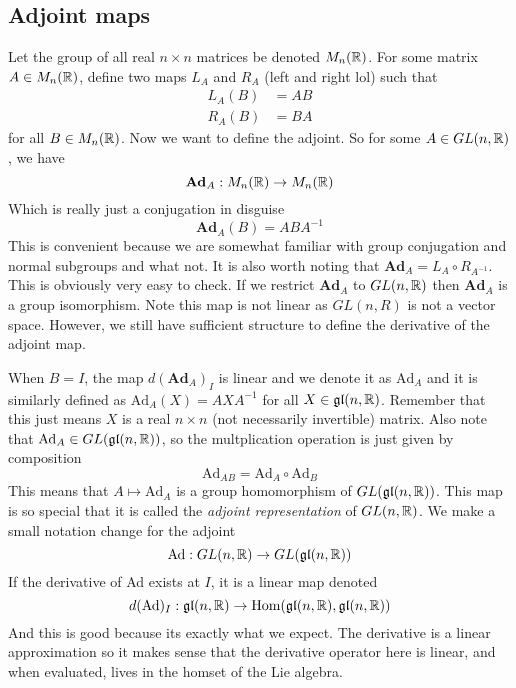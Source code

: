 \subsection{Adjoint maps}
Let the group of all real $n\times n$ matrices be denoted $M_n(\mathbb{R})$. For some matrix
$A\in M_n(\mathbb{R})$, define two maps $L_A$ and $R_A$ (left and right lol) such that
\begin{align*}
    L_A(B) &= AB\\
    R_A(B) &= BA
\end{align*}
for all $B\in M_n(\mathbb{R})$. Now we want to define the adjoint. So for some $A\in GL(n,\mathbb{R})$,
we have
\begin{equation*}
    \textbf{Ad}_A: M_n(\mathbb{R}) \to M_n(\mathbb{R})
\end{equation*}
Which is really just a conjugation in disguise
\begin{equation}
    \textbf{Ad}_A(B) = ABA^{-1}
\end{equation}
This is convenient because we are somewhat familiar with group conjugation and normal
subgroups and what not. It is also worth noting that $\textbf{Ad}_A = L_A
\circ R_{A^{-1}}$. This is obviously very easy to check. If we restrict $\textbf{Ad}_A$
to $GL(n,\mathbb{R})$ then $\textbf{Ad}_A$ is a group isomorphism. Note this map
is not linear as $GL(n,R)$ is not a vector space. However, we still have sufficient
structure to define the derivative of the adjoint map.

When $B=I$, the map $d(\textbf{Ad}_A)_I$ is linear and we denote it as $\text{Ad}_A$
and it is similarly defined as $\text{Ad}_A(X) = AXA^{-1}$ for all $X \in \mathfrak{gl}(n,\mathbb{R})$.
Remember that this just means $X$ is a real $n\times n$ (not necessarily invertible)
matrix. Also note that $\text{Ad}_A \in GL(\mathfrak{gl}(n,\mathbb{R}))$, so the multplication
operation is just given by composition
\begin{equation*}
    \text{Ad}_{AB} = \text{Ad}_A \circ \text{Ad}_B
\end{equation*}
This means that $A \mapsto \text{Ad}_A$ is a group homomorphism of $GL(\mathfrak{gl}(n,\mathbb{R}))$.
This map is so special that it is called the \textit{adjoint representation} of
$GL(n,\mathbb{R})$. We make a small notation change for the adjoint
\begin{equation*}
    \text{Ad}: GL(n,\mathbb{R}) \to GL(\mathfrak{gl}(n,\mathbb{R}))
\end{equation*}
If the derivative of Ad exists at $I$, it is a linear map denoted
\begin{equation}
    d(\text{Ad})_I:\mathfrak{gl}(n,\mathbb{R}) \to \text{Hom}(\mathfrak{gl}(n,\mathbb{R}),\mathfrak{gl}(n,\mathbb{R}))
\end{equation}
And this is good because its exactly what we expect. The derivative is a linear approximation
so it makes sense that the derivative operator here is linear, and when evaluated,
lives in the homset of the Lie algebra.